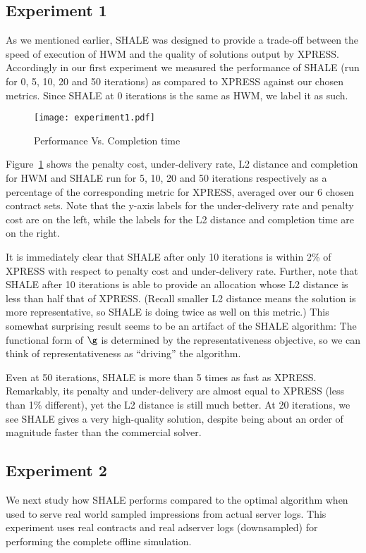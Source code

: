 \subsection{Experiment 1}
\label{subsec:expt 1}
As we mentioned earlier, SHALE was designed to provide a trade-off
between the speed of execution of HWM and the quality of solutions
output by XPRESS. Accordingly in our first experiment we measured the
performance of SHALE (run for 0, 5, 10, 20 and 50 iterations)
as compared to XPRESS against our chosen metrics.  Since SHALE at 0 iterations
is the same as HWM, we label it as such.
\begin{figure}[h!]
\centering
\texttt{[image: experiment1.pdf]}
\caption{Performance Vs. Completion time}
\label{fig:expt 1}
\end{figure}
Figure~\ref{fig:expt 1} shows the penalty cost, under-delivery rate,
L2 distance and completion  for HWM and SHALE run for 5, 10, 20 and 50
iterations respectively as a percentage of the corresponding metric
for XPRESS, averaged over our 6 chosen contract sets. 
Note that the y-axis labels for the under-delivery
rate and penalty cost are on the left, while the labels for the L2 distance and completion time are on the right.

It is immediately clear that SHALE after only 10 iterations is within  2\% of XPRESS with respect to penalty cost and
under-delivery rate. Further, note that SHALE after 10 iterations is able to provide an
allocation whose L2 distance is less than half that of
XPRESS.  (Recall smaller L2 distance means the solution is more representative, so SHALE is doing twice as well on this metric.) 
This somewhat surprising result seems to be an artifact of the SHALE algorithm: The functional form of $\g$ is determined 
by the representativeness objective, so we can think of representativeness as ``driving'' the algorithm.

Even at 50 iterations, SHALE is more than 5 times as fast as XPRESS.  Remarkably, its penalty and under-delivery
are almost equal to XPRESS (less than 1\% different), yet the L2 distance is still much better.
At 20 iterations, we see SHALE gives a very high-quality solution, despite being about an order of
magnitude faster than the commercial solver.


\subsection{Experiment 2}
\label{subsection:expt_serv}
We next study how SHALE performs compared to the optimal 
algorithm when used to serve real world sampled impressions from 
actual server logs. This experiment uses real contracts and real adserver logs 
(downsampled) for performing the complete offline simulation.

